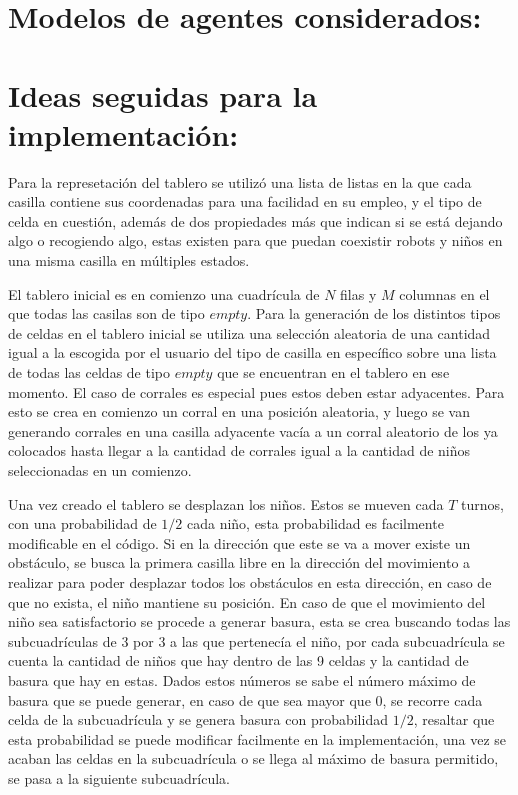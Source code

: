 \documentclass[titlepage,11pt]{scrartcl}
\begin{document}
\section{Modelos de agentes considerados:}

\section{Ideas seguidas para la implementación:}
Para la represetación del tablero se utilizó una lista de listas en la que cada casilla contiene sus coordenadas para una facilidad en su empleo, y el tipo de celda en cuestión, además de dos propiedades más que indican si se está dejando algo o recogiendo algo, estas existen para que puedan coexistir robots y niños en una misma casilla en múltiples estados.

El tablero inicial es en comienzo una cuadrícula de $N$ filas y $M$ columnas en el que todas las casilas son de tipo $empty$. Para la generación de los distintos tipos de celdas en el tablero inicial se utiliza una selección aleatoria de una cantidad igual a la escogida por el usuario del tipo de casilla en específico sobre una lista de todas las celdas de tipo $empty$ que se encuentran en el tablero en ese momento. El caso de corrales es especial pues estos deben estar adyacentes. Para esto se crea en comienzo un corral en una posición aleatoria, y luego se van generando corrales en una casilla adyacente vacía a un corral aleatorio de los ya colocados hasta llegar a la cantidad de corrales igual a la cantidad de niños seleccionadas en un comienzo.

Una vez creado el tablero se desplazan los niños. Estos se mueven cada $T$ turnos, con una probabilidad de $1/2$ cada niño, esta probabilidad es facilmente modificable en el código. Si en la dirección que este se va a mover existe un obstáculo, se busca la primera casilla libre en la dirección del movimiento a realizar para poder desplazar todos los obstáculos en esta dirección, en caso de que no exista, el niño mantiene su posición. En caso de que el movimiento del niño sea satisfactorio se procede a generar basura, esta se crea buscando todas las subcuadrículas de $3$ por $3$ a las que pertenecía el niño, por cada subcuadrícula se cuenta la cantidad de niños que hay dentro de las 9 celdas y la cantidad de basura que hay en estas. Dados estos números se sabe el número máximo de basura que se puede generar, en caso de que sea mayor que 0, se recorre cada celda de la subcuadrícula y se genera basura con probabilidad $1/2$, resaltar que esta probabilidad se puede modificar facilmente en la implementación, una vez se acaban las celdas en la subcuadrícula o se llega al máximo de basura permitido, se pasa a la siguiente subcuadrícula.
\end{document}
